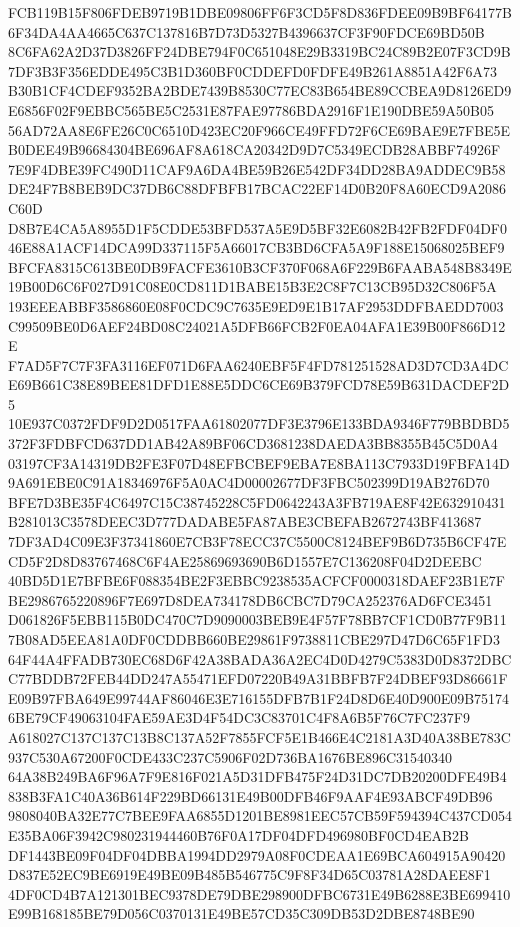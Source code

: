 \documentclass[UTF8,fontset=fandol,zihao=-4,a4paper]{ctexart}
\begin{document}
{{FCB119B15F806FDEB9719B1DBE09806FF6F3CD5F8D836FDEE09B9BF64177B6F34DA4AA4665C637C137816B7D73D5327B4396637CF3F90FDCE69BD50B
8C6FA62A2D37D3826FF24DBE794F0C651048E29B3319BC24C89B2E07F3CD9B7DF3B3F356EDDE495C3B1D360BF0CDDEFD0FDFE49B261A8851A42F6A73
B30B1CF4CDEF9352BA2BDE7439B8530C77EC83B654BE89CCBEA9D8126ED9E6856F02F9EBBC565BE5C2531E87FAE97786BDA2916F1E190DBE59A50B05
56AD72AA8E6FE26C0C6510D423EC20F966CE49FFD72F6CE69BAE9E7FBE5EB0DEE49B96684304BE696AF8A618CA20342D9D7C5349ECDB28ABBF74926F
7E9F4DBE39FC490D11CAF9A6DA4BE59B26E542DF34DD28BA9ADDEC9B58DE24F7B8BEB9DC37DB6C88DFBFB17BCAC22EF14D0B20F8A60ECD9A2086C60D
D8B7E4CA5A8955D1F5CDDE53BFD537A5E9D5BF32E6082B42FB2FDF04DF046E88A1ACF14DCA99D337115F5A66017CB3BD6CFA5A9F188E15068025BEF9
BFCFA8315C613BE0DB9FACFE3610B3CF370F068A6F229B6FAABA548B8349E19B00D6C6F027D91C08E0CD811D1BABE15B3E2C8F7C13CB95D32C806F5A
193EEEABBF3586860E08F0CDC9C7635E9ED9E1B17AF2953DDFBAEDD7003C99509BE0D6AEF24BD08C24021A5DFB66FCB2F0EA04AFA1E39B00F866D12E
F7AD5F7C7F3FA3116EF071D6FAA6240EBF5F4FD781251528AD3D7CD3A4DCE69B661C38E89BEE81DFD1E88E5DDC6CE69B379FCD78E59B631DACDEF2D5
10E937C0372FDF9D2D0517FAA61802077DF3E3796E133BDA9346F779BBDBD5372F3FDBFCD637DD1AB42A89BF06CD3681238DAEDA3BB8355B45C5D0A4
03197CF3A14319DB2FE3F07D48EFBCBEF9EBA7E8BA113C7933D19FBFA14D9A691EBE0C91A18346976F5A0AC4D00002677DF3FBC502399D19AB276D70
BFE7D3BE35F4C6497C15C38745228C5FD0642243A3FB719AE8F42E632910431B281013C3578DEEC3D777DADABE5FA87ABE3CBEFAB2672743BF413687
7DF3AD4C09E3F37341860E7CB3F78ECC37C5500C8124BEF9B6D735B6CF47ECD5F2D8D83767468C6F4AE25869693690B6D1557E7C136208F04D2DEEBC
40BD5D1E7BFBE6F088354BE2F3EBBC9238535ACFCF0000318DAEF23B1E7FBE2986765220896F7E697D8DEA734178DB6CBC7D79CA252376AD6FCE3451
D061826F5EBB115B0DC470C7D9090003BEB9E4F57F78BB7CF1CD0B77F9B117B08AD5EEA81A0DF0CDDBB660BE29861F9738811CBE297D47D6C65F1FD3
64F44A4FFADB730EC68D6F42A38BADA36A2EC4D0D4279C5383D0D8372DBCC77BDDB72FEB44DD247A55471EFD07220B49A31BBFB7F24DBEF93D86661F
E09B97FBA649E99744AF86046E3E716155DFB7B1F24D8D6E40D900E09B751746BE79CF49063104FAE59AE3D4F54DC3C83701C4F8A6B5F76C7FC237F9
A618027C137C137C13B8C137A52F7855FCF5E1B466E4C2181A3D40A38BE783C937C530A67200F0CDE433C237C5906F02D736BA1676BE896C31540340
64A38B249BA6F96A7F9E816F021A5D31DFB475F24D31DC7DB20200DFE49B4838B3FA1C40A36B614F229BD66131E49B00DFB46F9AAF4E93ABCF49DB96
9808040BA32E77C7BEE9FAA6855D1201BE8981EEC57CB59F594394C437CD054E35BA06F3942C980231944460B76F0A17DF04DFD496980BF0CD4EAB2B
DF1443BE09F04DF04DBBA1994DD2979A08F0CDEAA1E69BCA604915A90420D837E52EC9BE6919E49BE09B485B546775C9F8F34D65C03781A28DAEE8F1
4DF0CD4B7A121301BEC9378DE79DBE298900DFBC6731E49B6288E3BE699410E99B168185BE79D056C0370131E49BE57CD35C309DB53D2DBE8748BE90
}}
\end{document}
